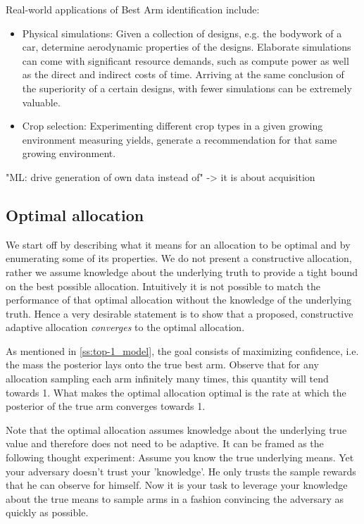 Real-world applications of Best Arm identification include:
\begin{itemize}
  \item Physical simulations: Given a collection of designs, e.g. the bodywork
  of a car, determine aerodynamic properties of the designs. Elaborate
  simulations can come with significant resource demands, such as compute power
  as well as the direct and indirect costs of time. Arriving at the same
  conclusion of the superiority of a certain designs, with fewer simulations can
  be extremely valuable.
  \item Crop selection: Experimenting different crop types in a given growing
  environment measuring yields, generate a recommendation for that same growing
  environment.
\end{itemize}

"ML: drive generation of own data instead of" -> it is about acquisition

\subsection{Optimal allocation}\label{subsection:optimal_allocation}

We start off by describing what it means for an allocation to be optimal and by
enumerating some of its properties. We do not present a constructive allocation,
rather we assume knowledge about the underlying truth to provide a tight bound
on the best possible allocation. Intuitively it is not possible to match the
performance of that optimal allocation without the knowledge of the underlying
truth. Hence a very desirable statement is to show that a proposed, constructive
adaptive allocation \emph{converges} to the optimal allocation.

As mentioned in \ref{ss:top-1_model}, the goal consists of maximizing
confidence, i.e. the mass the posterior lays onto the true best arm. Observe
that for any allocation sampling each arm infinitely many times, this quantity
will tend towards 1. What makes the optimal allocation optimal is the rate at
which the posterior of the true arm converges towards 1.

Note that the optimal allocation assumes knowledge about the underlying true
value and therefore does not need to be adaptive. It can be framed as the
following thought experiment: Assume you know the true underlying means. Yet
your adversary doesn't trust your 'knowledge'. He only trusts the sample rewards
that he can observe for himself. Now it is your task to leverage your knowledge
about the true means to sample arms in a fashion convincing the adversary as
quickly as possible.

